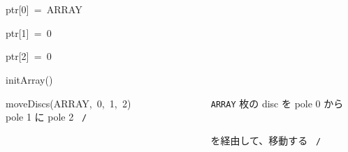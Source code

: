 \documentclass{article}
\begin{document}
\noindent
\mbox{}\hfill

\noindent
\mbox{}ptr[0]{\tt\mc \ }={\tt\mc \ }ARRAY

\noindent
\mbox{}ptr[1]{\tt\mc \ }={\tt\mc \ }0

\noindent
\mbox{}ptr[2]{\tt\mc \ }={\tt\mc \ }0

\noindent
\mbox{}\hfill

\noindent
\mbox{}initArray()

\noindent
\mbox{}moveDiscs(ARRAY,{\tt\mc \ }0,{\tt\mc \ }1,{\tt\mc \ }2){\tt\mc \ \ \ \ \ \ \ }{\tt\mc \ \ \ \ \ \ \ \ }\rm\mc {\tt /}{\tt *}\  {}{\tt ARRAY} 枚の disc を
					   pole 0 から pole 1 に pole 2
					   \hfill \rm\mc \ {\tt *}{\tt /}
\tt\mc 

\noindent
\mbox{}{\tt\mc \ \ \ \ \ \ \ \ }{\tt\mc \ \ \ \ \ \ \ \ }{\tt\mc \ \ \ \ \ \ \ \ }{\tt\mc \ \ \ \ \ \ \ \ }{\tt\mc \ \ \ \ \ \ \ \ }\rm\mc {\tt /}{\tt *}\  {}を経由して、移動する \hfill \rm\mc \ {\tt *}{\tt /}
\tt\mc 

\noindent
\mbox{}

\rm\mc
\end{document}
